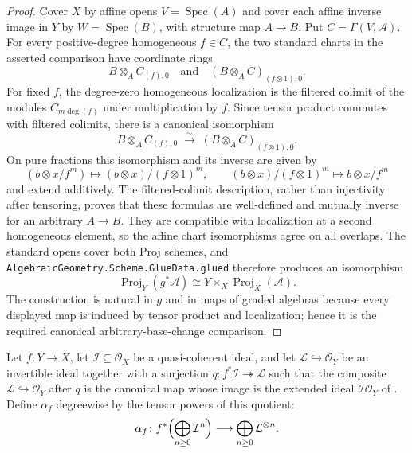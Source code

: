 \begin{proof}
  Cover $X$ by affine opens $V=\operatorname{Spec}(A)$ and cover each affine
  inverse image in $Y$ by $W=\operatorname{Spec}(B)$, with structure map
  $A\to B$.  Put $C=\Gamma(V,\mathcal A)$.  For every positive-degree
  homogeneous $f\in C$, the two standard charts in the asserted comparison
  have coordinate rings
  \[
    B\otimes_A C_{(f),0}\quad\text{and}\quad
    (B\otimes_A C)_{(f\otimes1),0}.
  \]
  For fixed $f$, the degree-zero homogeneous localization is the filtered
  colimit of the modules $C_{m\deg(f)}$ under multiplication by $f$.
  Since tensor product commutes with filtered colimits, there is a canonical
  isomorphism
  \[
    B\otimes_A C_{(f),0}\;\xrightarrow{\sim}\;
    (B\otimes_A C)_{(f\otimes1),0}.
  \]
  On pure fractions this isomorphism and its inverse are given by
  \[
    (b\otimes x/f^m)\longmapsto (b\otimes x)/(f\otimes1)^m,
    \qquad
    (b\otimes x)/(f\otimes1)^m\longmapsto b\otimes x/f^m
  \]
  and extend additively.  The filtered-colimit description, rather than
  injectivity after tensoring, proves that these formulas are well-defined and
  mutually inverse for an arbitrary $A\to B$.  They are compatible with
  localization at a second homogeneous element, so the affine chart
  isomorphisms agree on all overlaps.  The standard opens cover both Proj
  schemes, and \texttt{AlgebraicGeometry.Scheme.GlueData.glued} therefore
  produces an
  isomorphism
  \[
    \operatorname{Proj}_Y(g^*\mathcal A)\cong
    Y\times_X\operatorname{Proj}_X(\mathcal A).
  \]
  The construction is natural in $g$ and in maps of graded algebras because
  every displayed map is induced by tensor product and localization; hence it
  is the required canonical arbitrary-base-change comparison.
\end{proof}

\begin{definition}
  \label{def:nagata-blowup-universal-graded-map}

  Let $f\colon Y\to X$, let $\mathcal I\subseteq\mathcal O_X$ be a
  quasi-coherent ideal, and let
  $\mathcal L\hookrightarrow\mathcal O_Y$ be an invertible ideal together with
  a surjection $q\colon f^*\mathcal I\twoheadrightarrow\mathcal L$ such that
  the composite $\mathcal L\hookrightarrow\mathcal O_Y$ after $q$ is the
  canonical map whose image is the extended ideal
  $\mathcal I\mathcal O_Y$ of
  .  Define $\alpha_f$ degreewise by the
  tensor powers of this quotient:
  \[
    \alpha_f\colon
    f^*\Bigl(\bigoplus_{n\geq0}\mathcal I^n\Bigr)
      \longrightarrow\bigoplus_{n\geq0}\mathcal L^{\otimes n}.
  \]
\end{definition}

